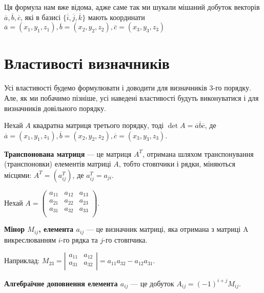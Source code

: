 Ця формула нам вже відома, адже саме так ми шукали мішаний добуток
векторів $\overline{a}, \overline{b}, \overline{c}$, які в базисі
$\{\overline{i}, \overline{j}, \overline{k}\}$ мають координати
$\overline{a} = (x_1, y_1, z_1), \overline{b} = (x_2, y_2, z_2), \overline{c} = (x_3, y_3, z_3)$

\section{Властивості визначників}

Усі властивості будемо формулювати і доводити для визначників 3-го порядку.
Але, як ми побачимо пізніше, усі наведені властивості будуть
виконуватися і для визначників довільного порядку.

Нехай $A$ квадратна матриця третього порядку, тоді $\det A = \overline{a}\overline{b}\overline{c}$,
де $\overline{a} = (x_1, y_1, z_1), \overline{b} = (x_2, y_2, z_2), \overline{c} = (x_3, y_3, z_3)$.

\begin{definition}
	\textbf{Транспонована матриця} --- це матриця $A^T$, отримана шляхом транспонування (транспоновки) елементів матриці $A$, тобто стовпчики і рядки, міняються місцями: $A^T = (a_{ij}^T)$, де $a_{ij}^T = a_{ji}$.
\end{definition}

Нехай $A = \begin{pmatrix}
	a_{11} & a_{12} & a_{13} \\
	a_{21} & a_{22} & a_{23} \\
	a_{31} & a_{32} & a_{33} \\
\end{pmatrix}$.

\begin{definition}
	\textbf{Мінор $M_{ij}$, елемента $a_{ij}$} --- це визначник матриці, яка отримана з
	матриці A викреслюванням $i$-го рядка та $j$-го стовпчика. 
\end{definition}

Наприклад: $M_{23} = \left|\begin{matrix}
	a_{11} & a_{12} \\
	a_{31} & a_{32} \\
\end{matrix}\right| = a_{11}a_{32} - a_{12}a_{31}$.

\begin{definition}
	\textbf{Алгебраїчне доповнення елемента $a_{ij}$} --- це добуток $A_{ij} = (-1)^{i+j}M_{ij}$.
\end{definition}

